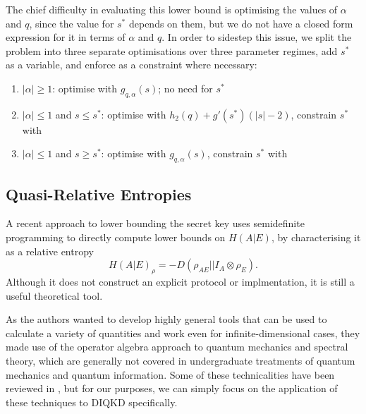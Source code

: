 \documentclass[10pt, a4paper]{article}
\numberwithin{equation}{section} %
\theoremstyle{definition}
\theoremstyle{plain}
\newcommand{\abs}[1]{\left\lvert#1\right\rvert}
\newcommand{\?}{\mathrel{?}} %
\begin{document}
    The chief difficulty in evaluating this lower bound is optimising the values of \(\alpha\) and \(q\), since the value for \(s^*\) depends on them, but we do not have a closed form expression for it in terms of \(\alpha\) and \(q\). In order to sidestep this issue, we split the problem into three separate optimisations over three parameter regimes, add \(s^*\) as a variable, and enforce  as a constraint where necessary:
    \begin{enumerate}
      \item \(\abs{\alpha} \geq 1\): optimise with \(g_{q,\alpha}(s)\); no need for \(s^*\)
      \item \(\abs{\alpha} \leq 1\) and \(s \leq s^*\): optimise with \(h_2(q) + g'(s^*)(\abs{s}-2)\), constrain \(s^*\) with 
      \item \(\abs{\alpha} \leq 1\) and \(s \geq s^*\): optimise with \(g_{q,\alpha}(s)\), constrain \(s^*\) with 
    \end{enumerate}

    \subsection{Quasi-Relative Entropies}

    A recent approach to lower bounding the secret key uses semidefinite programming to directly compute lower bounds on \(H(A|E)\), by characterising it as a relative entropy
    \begin{equation}
      H{(A|E)}_{\rho} = -D(\rho_{AE}||I_A \otimes \rho_{E}).
    \end{equation}
    Although it does not construct an explicit protocol or implmentation, it is still a useful theoretical tool. 

    As the authors wanted to develop highly general tools that can be used to calculate a variety of quantities and work even for infinite-dimensional cases, they made use of the operator algebra approach to quantum mechanics and spectral theory, which are generally not covered in undergraduate treatments of quantum mechanics and quantum information. Some of these technicalities have been reviewed in , but for our purposes, we can simply focus on the application of these techniques to DIQKD specifically.
\end{document}
